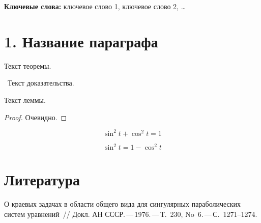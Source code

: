 










{\noindent\footnotesize{\bf Ключевые
 слова:} ключевое слово 1, ключевое слово 2, \ldots\par}



\section*{1. Название параграфа}



Текст теоремы. \Endproc

\beginproof~Текст доказательства.~\endproof


Текст леммы.\Endproc




\begin{proof}
Очевидно.
\end{proof}


\begin{equation}
	\label{eq:main}
	\sin^2 t + \cos^2 t = 1
\end{equation}

\begin{equation}
	\label{eq:aux}
	\sin^2 t = 1 - \cos^2 t
\end{equation}











\section*{Литература}

\begin{enumerate}
 {\footnotesize
 \itemsep=0pt \parskip=0pt
 \leftskip=-10pt



  {О краевых задачах в области общего вида для сингулярных
 параболических систем уравнений~/\!/ Докл. АН СССР.\,---\,1976.\,---\,Т.~230, No~6.\,---\,С.~1271--1274.}




}
 \end{enumerate}

